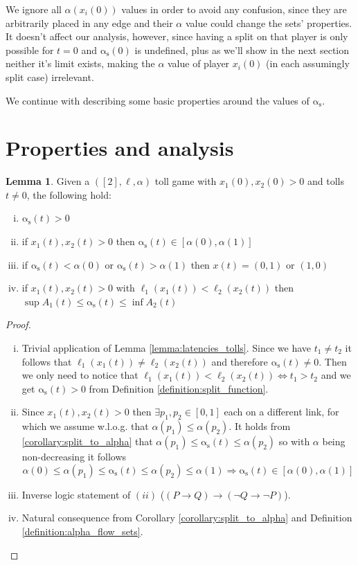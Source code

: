 \documentclass[10pt,a4paper]{book}
\newcommand{\as}{\mathrm{\alpha_s}}
\theoremstyle{definition}
\newtheorem{lemma}[definition]{Lemma}
\theoremstyle{comment}
\begin{document}
We ignore all $\alpha(x_i(0))$ values in order to avoid any confusion, since they are arbitrarily placed in any edge and their $\alpha$ value could change the sets' properties.
It doesn't affect our analysis, however, since having a split on that player is only possible for $t = 0$ and $\as(0)$ is undefined, plus as we'll show in the next section neither it's limit exists, making the $\alpha$ value of player $x_i(0)$ (in each assumingly split case) irrelevant.

We continue with describing some basic properties around the values of $\as$.

\section{Properties and analysis}

\begin{lemma}
	\label{lemma:split_basic}
	Given a $([2], \ell, \alpha)$ toll game with $x_1(0), x_2(0) > 0$ and tolls $t \ne 0$, the following hold:
	\begin{enumerate}[(i)]
		\item $\as(t) > 0$
		\item if $x_1(t), x_2(t) > 0$ then $\as(t) \in [\alpha(0), \alpha(1)]$
		\item if $\as(t) < \alpha(0)$ or $\as(t) > \alpha(1)$ then $x(t) = (0, 1)$ or $(1, 0)$
		\item if $x_1(t), x_2(t) > 0$ with $\ell_1(x_1(t)) < \ell_2(x_2(t))$ then\\
		$\sup A_1(t) \le \as(t) \le \inf A_2(t)$
	\end{enumerate}
\end{lemma}

\begin{proof}
	$ $ %
	\begin{enumerate}[(i)]
		\item Trivial application of Lemma \ref{lemma:latencies_tolls}.
		Since we have $t_1 \ne t_2$ it follows that $\ell_1(x_1(t)) \ne \ell_2(x_2(t))$ and therefore $\as(t) \ne 0$.
		Then we only need to notice that $\ell_1(x_1(t)) < \ell_2(x_2(t)) \Leftrightarrow t_1 > t_2$ and we get $\as(t) > 0$ from Definition \ref{definition:split_function}.
		\item Since $x_1(t), x_2(t) > 0$ then $\exists p_1, p_2 \in [0, 1]$ each on a different link, for which we assume w.l.o.g. that $\alpha(p_1) \le \alpha(p_2)$.
		It holds from \ref{corollary:split_to_alpha} that $\alpha(p_1) \le \as(t) \le \alpha(p_2)$ so with $\alpha$ being non-decreasing it follows
		\[\alpha(0) \le \alpha(p_1) \le \as(t) \le \alpha(p_2) \le \alpha(1) \Rightarrow \as(t) \in [\alpha(0), \alpha(1)]\]
		\item Inverse logic statement of $(ii)$ ($(P \rightarrow Q) \rightarrow (\neg Q \rightarrow \neg P)$).
		\item Natural consequence from Corollary \ref{corollary:split_to_alpha} and Definition \ref{definition:alpha_flow_sets}.
	\end{enumerate}
\end{proof}
\end{document}
